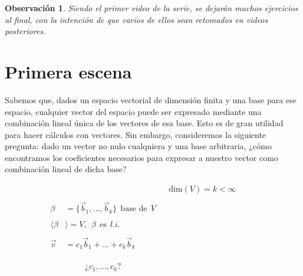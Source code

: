 \documentclass[12pt,dvipsnames]{article}
\newtheorem{obs}{Observación}[section]
\numberwithin{equation}{section}
\begin{document}
\begin{obs}
    Siendo el primer video de la serie, se dejarán muchos ejercicios al final, con la intención de que varios de ellos sean retomados en videos posteriores.
\end{obs}


\newpage
\section{Primera escena}

Sabemos que, dados un espacio vectorial de dimensión finita y una base para ese espacio, cualquier vector del espacio puede ser expresado mediante una combinación lineal única de los vectores de esa base. Esto es de gran utilidad para hacer cálculos con vectores. Sin embargo, consideremos la siguiente pregunta: dado un vector no nulo cualquiera y una base arbitraria, ¿cómo encontramos los coeficientes necesarios para expresar a nuestro vector como combinación lineal de dicha base?

\begin{align*}
    & & &\text{dim}(V)=k<\infty& & &\\
    \\
    \beta&=\{\vec{b}_1,...,\vec{b}_k\} \ \ \text{base de} \ \ V& & & & &\\
    \\
    \langle\beta&\rangle = V, \ \ \beta \ \ \text{es} \ \ l.i.& & & & & \\
    \\
    \vec{v}&= c_1\vec{b}_1 + ... + c_k\vec{b}_k& & & & & \\
    \\
    \\
    \\
    & \quad \quad \ \ \text{¿}c_1,...,c_k\text{?} & & & & &
\end{align*}
\end{document}
